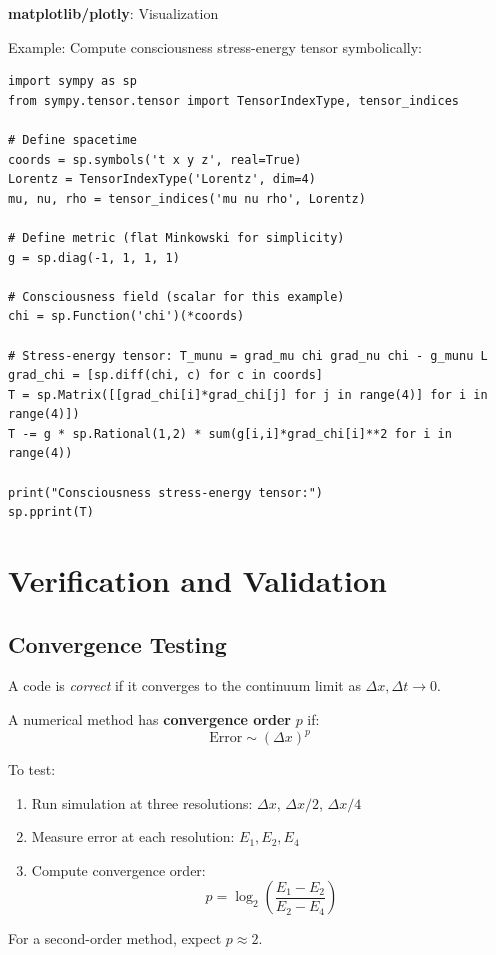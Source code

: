 \textbf{matplotlib/plotly}: Visualization

Example: Compute consciousness stress-energy tensor symbolically:

\begin{lstlisting}[style=python]
import sympy as sp
from sympy.tensor.tensor import TensorIndexType, tensor_indices

# Define spacetime
coords = sp.symbols('t x y z', real=True)
Lorentz = TensorIndexType('Lorentz', dim=4)
mu, nu, rho = tensor_indices('mu nu rho', Lorentz)

# Define metric (flat Minkowski for simplicity)
g = sp.diag(-1, 1, 1, 1)

# Consciousness field (scalar for this example)
chi = sp.Function('chi')(*coords)

# Stress-energy tensor: T_munu = grad_mu chi grad_nu chi - g_munu L
grad_chi = [sp.diff(chi, c) for c in coords]
T = sp.Matrix([[grad_chi[i]*grad_chi[j] for j in range(4)] for i in range(4)])
T -= g * sp.Rational(1,2) * sum(g[i,i]*grad_chi[i]**2 for i in range(4))

print("Consciousness stress-energy tensor:")
sp.pprint(T)
\end{lstlisting}

\section{Verification and Validation}

\subsection{Convergence Testing}

A code is \textit{correct} if it converges to the continuum limit as $\Delta x, \Delta t \to 0$.

\begin{definition}\label{def:convergence-order}
A numerical method has \textbf{convergence order} $p$ if:
\begin{equation}
\text{Error} \sim (\Delta x)^p
\end{equation}

To test:
\begin{enumerate}
\item Run simulation at three resolutions: $\Delta x$, $\Delta x / 2$, $\Delta x / 4$
\item Measure error at each resolution: $E_1, E_2, E_4$
\item Compute convergence order:
\begin{equation}
p = \log_2\left( \frac{E_1 - E_2}{E_2 - E_4} \right)
\end{equation}
\end{enumerate}

For a second-order method, expect $p \approx 2$.
\end{definition}

